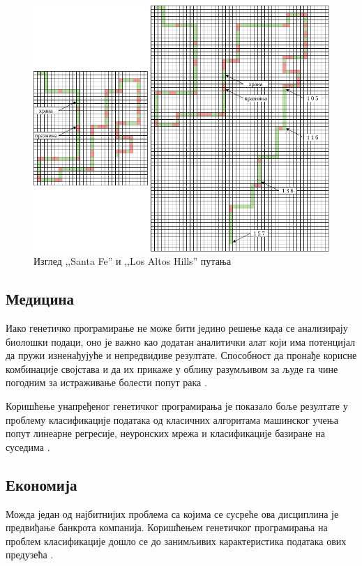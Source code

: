 \documentclass[a4paper]{article}
\begin{document}
\begin{figure}[ht!]
    \begin{center}
        \includegraphics[scale=0.35]{santa_fe.png}
    \end{center}
    \caption{Изглед ,,Santa Fe'' и ,,Los Altos Hills'' путања}
    \label{fig:santa_fe}
\end{figure}

\subsection{Медицина}
Иако генетичко програмирање не може бити једино решење када се анализирају биолошки подаци, оно је важно као додатан аналитички алат који има потенцијал да пружи изненађујуће и непредвидиве резултате. Способност да пронађе корисне комбинације својстава и да их прикаже у облику разумљивом за људе га чине погодним за истраживање болести попут рака \cite{cancer}.

Коришћење унапређеног генетичког програмирања је показало боље резултате у проблему класификације података од класичних алгоритама машинског учења попут линеарне регресије, неуронских мрежа и класификације базиране на суседима \cite{egp}.

\subsection{Економија}
Можда један од најбитнијих проблема са којима се сусреће ова дисциплина је предвиђање банкрота компанија. Коришћењем генетичког програмирања на проблем класификације дошло се до занимљивих карактеристика података ових предузећа \cite{bankruptcy}.
\end{document}
